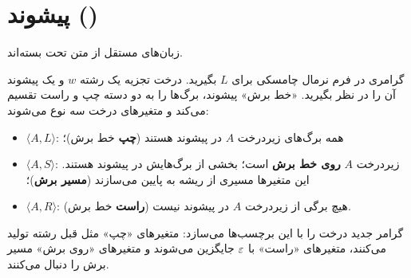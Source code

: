 \section{پیشوند ()}

\begin{theorem}
زبان‌های مستقل از متن تحت  بسته‌اند.
\end{theorem}

\begin{proofidea}
گرامری در فرم نرمال چامسکی برای $L$ بگیرید. درخت تجزیه یک رشته $w$ و یک پیشوند آن را در نظر بگیرید. «خط برش» پیشوند، برگ‌ها را به دو دسته چپ و راست تقسیم می‌کند و متغیرهای درخت سه نوع می‌شوند:
\begin{itemize}
\item $\langle A,L\rangle$: همه برگ‌های زیردرخت $A$ در پیشوند هستند (\textbf{چپ} خط برش)؛
\item $\langle A,S\rangle$: زیردرخت $A$ \textbf{روی خط برش} است؛ بخشی از برگ‌هایش در پیشوند هستند. این متغیرها مسیری از ریشه به پایین می‌سازند (\textbf{مسیر برش})؛
\item $\langle A,R\rangle$: هیچ برگی از زیردرخت $A$ در پیشوند نیست (\textbf{راست} خط برش).
\end{itemize}
گرامر جدید درخت را با این برچسب‌ها می‌سازد: متغیرهای «چپ» مثل قبل رشته تولید می‌کنند، متغیرهای «راست» با $\varepsilon$ جایگزین می‌شوند و متغیرهای «روی برش» مسیر برش را دنبال می‌کنند.
\end{proofidea}

